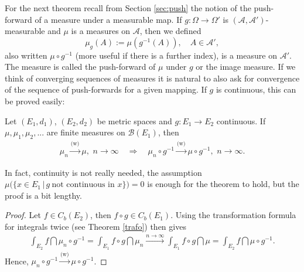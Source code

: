 For the next theorem recall from Section \ref{sec:push} the notion of the push-forward of a measure under a measurable map. If $g:\Omega \rightarrow \Omega'$ is $(\mathcal A, \mathcal A')$-measurable and $\mu$ is a measures on $\mathcal A$, then we defined $$\mu_g(A):=\mu(g^{-1}(A)),\quad A\in \mathcal A',$$ also written $\mu\circ g^{-1}$ (more useful if there is a further index), is a measure on $\mathcal A'$. The measure is called the push-forward of $\mu$ under $g$ or the image measure. If we think of converging sequences of measures it is natural to also ask for convergence of the sequence of push-forwards for a given mapping. If $g$ is continuous, this can be proved easily:
\begin{laussagewerkzeug}
\begin{theorem}\label{thm:continuousmapping}
	Let $(E_1,d_1)$, $(E_2,d_2)$ be metric spaces and $g\colon E_1 \to E_2$ continuous.
	If $\mu,\mu_1,\mu_2,...$ are finite measures on $\mathcal B(E_1)$, then
	\begin{align*}
		 \mu_n \overset{\text{(w)}}{\rightarrow} \mu,\,\, n\to\infty\quad \Longrightarrow \quad   \mu_n\circ g^{-1} \overset{\text{(w)}}{\rightarrow} \mu\circ g^{-1},\,\, n\to\infty.
	\end{align*}
\end{theorem}
\end{laussagewerkzeug}
In fact, continuity is not really needed, the assumption $\mu\big( \{ x\in E_1 \,|\, g \:\text{not continuous in }x \}\big) = 0$ is enough for the theorem to hold, but the proof is a bit lengthy.
\begin{proof}[Proof]
 Let $f\in C_b(E_2)$, then $f\circ g \in C_b(E_1)$. Using the transformation formula for integrals twice (see Theorem \ref{trafo}) then gives
\begin{align*}
	\int_{E_2}f\dint \mu_n \circ g^{-1} = \int_{E_1} f\circ g \dint \mu_n \overset{n\to\infty}{\longrightarrow} \int_{E_1}f\circ g \dint \mu  = \int_{E_2} f\dint \mu \circ g^{-1}.
\end{align*}
Hence, $\mu_n \circ g^{-1} \overset{\text{(w)}}{\rightarrow} \mu \circ g^{-1}$.
\end{proof}
